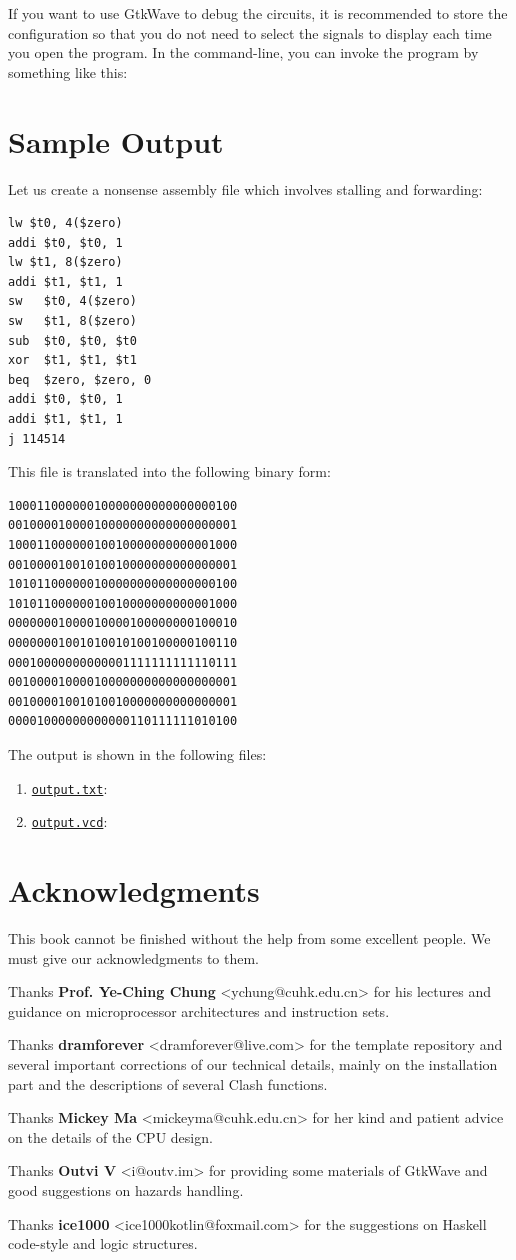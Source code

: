 \documentclass[a4paper,12pt, oneside]{book}
\begin{document}
If you want to use GtkWave to debug the circuits, it is recommended to store the configuration so that you do not need to select the signals to display each time you open the program. In the command-line, you can invoke the program by something like this:

\chapter{Sample Output}
Let us create a nonsense assembly file which involves stalling and forwarding:
\begin{verbatim}
lw $t0, 4($zero)
addi $t0, $t0, 1
lw $t1, 8($zero)
addi $t1, $t1, 1
sw   $t0, 4($zero)
sw   $t1, 8($zero)
sub  $t0, $t0, $t0
xor  $t1, $t1, $t1
beq  $zero, $zero, 0
addi $t0, $t0, 1
addi $t1, $t1, 1
j 114514
\end{verbatim}
This file is translated into the following binary form:
\begin{verbatim}
10001100000010000000000000000100
00100001000010000000000000000001
10001100000010010000000000001000
00100001001010010000000000000001
10101100000010000000000000000100
10101100000010010000000000001000
00000001000010000100000000100010
00000001001010010100100000100110
00010000000000001111111111110111
00100001000010000000000000000001
00100001001010010000000000000001
00001000000000000110111111010100
\end{verbatim}
The output is shown in the following files:
\begin{enumerate}
	\item \href{https://yifan.cowtransfer.com/s/166018e0ad394b}{\texttt{output.txt}}: 
	\item \href{https://yifan.cowtransfer.com/s/e10ff6693c3149}{\texttt{output.vcd}}: 
\end{enumerate}
\chapter{Acknowledgments}
This book cannot be finished without the help from some excellent people. We must give our acknowledgments to them.

Thanks \textbf{Prof. Ye-Ching Chung} <ychung@cuhk.edu.cn> for his lectures and guidance on microprocessor architectures and instruction sets.

Thanks \textbf{dramforever} <dramforever@live.com> for the template repository and several important corrections of our technical details, mainly on the installation part and the descriptions of several Clash functions.

Thanks \textbf{Mickey Ma} <mickeyma@cuhk.edu.cn> for her kind and patient advice on the details of the CPU design.

Thanks \textbf{Outvi V} <i@outv.im> for providing some materials of GtkWave and good suggestions on hazards handling.

Thanks \textbf{ice1000} <ice1000kotlin@foxmail.com> for the suggestions on Haskell code-style and logic structures.
\end{document}

